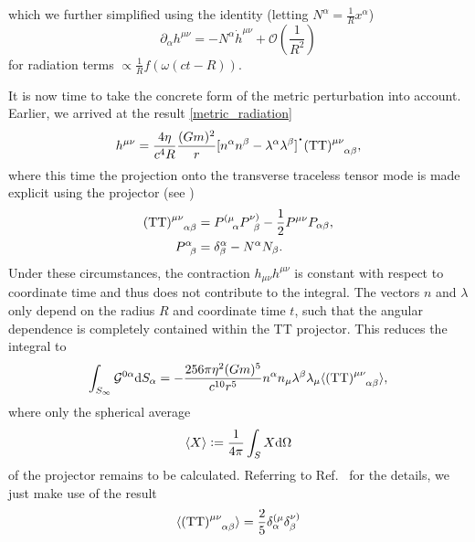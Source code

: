 which we further simplified using the identity (letting $N^\alpha = \frac{1}{R}x^\alpha$)
\begin{equation}
  \partial_\alpha h^{\mu\nu} = -N^\alpha \dot h^{\mu\nu} + \mathcal O\left(\frac{1}{R^2}\right)
\end{equation}
for radiation terms $\propto\frac{1}{R}f(\omega(ct-R))$.

It is now time to take the concrete form of the metric perturbation into account. Earlier, we arrived at the result \eqref{metric_radiation}
\begin{equation}
  h^{\mu\nu} = \frac{4\eta}{c^4 R}\frac{(Gm)^2}{r}\lbrack n^\alpha n^\beta-\lambda^\alpha\lambda^\beta\rbrack^{\scalebox{1.5}{$\cdot$}} (\mathrm{TT})^{\mu\nu}_{\hphantom{\mu\nu}\alpha\beta},
\end{equation}
where this time the projection onto the transverse traceless tensor mode is made explicit using the projector (see \cite{poisson2014gravity})
\begin{equation}
  \begin{aligned}
    (\mathrm{TT})^{\mu\nu}_{\hphantom{\mu\nu}\alpha\beta} = {} & P^{(\mu}_{\hphantom{(\mu}\alpha} P^{\nu)}_{\hphantom{\nu}\beta} - \frac{1}{2} P^{\mu\nu} P_{\alpha\beta}, \\
    P^{\alpha}_{\hphantom{\alpha}\beta} = {} & \delta^\alpha_\beta - N^\alpha N_\beta.
  \end{aligned}
\end{equation}
Under these circumstances, the contraction $h_{\mu\nu} h^{\mu\nu}$ is constant with respect to coordinate time and thus does not contribute to the integral. The vectors $n$ and $\lambda$ only depend on the radius $R$ and coordinate time $t$, such that the angular dependence is completely contained within the TT projector. This reduces the integral to
\begin{equation}
  \int_{S_\infty}\mathcal G^{0\alpha}\mathrm dS_\alpha = -\frac{256\pi\eta^2(Gm)^5}{c^{10}r^5} n^\alpha n_\mu \lambda^\beta \lambda_\mu \langle(\mathrm{TT})^{\mu\nu}_{\hphantom{\mu\nu}\alpha\beta}\rangle,
\end{equation}
where only the spherical average
\begin{equation}
  \langle X\rangle \vcentcolon= \frac{1}{4\pi}\int_S X \mathrm d\Omega
\end{equation}
of the projector remains to be calculated. Referring to Ref.\ \cite{poisson2014gravity} for the details, we just make use of the result
\begin{equation}
  \langle(\mathrm{TT})^{\mu\nu}_{\hphantom{\mu\nu}\alpha\beta}\rangle = \frac{2}{5} \delta^{(\mu}_\alpha\delta^{\nu)}_\beta
\end{equation}
